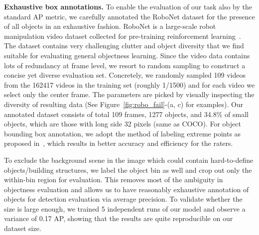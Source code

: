 \documentclass[10pt,twocolumn,letterpaper]{article}
\newcommand{\figureref}[1]{Figure~\ref{#1}}
\renewcommand{\paragraph}[1]{\vspace{1mm}\noindent\textbf{#1}}
\begin{document}
\paragraph{Exhaustive box annotations.} \quad
To enable the evaluation of our task also by the standard AP metric, we carefully annotated the RoboNet dataset for the presence of all objects in an exhaustive fashion. RoboNet is a large-scale robot manipulation video dataset collected for pre-training reinforcement learning~\cite{dasari2019robonet}. The dataset contains very challenging clutter and object diversity that we find suitable for evaluating general objectness learning. Since the video data contains lots of redundancy at frame level, we resort to random sampling to construct a concise yet diverse evaluation set. Concretely, we randomly sampled 109 videos from the 162417 videos in the training set (roughly 1/1500) and for each video we select only the center frame. The parameters are picked by visually inspecting the diversity of resulting data (See \figureref{fig:robo_fail}-(a, c) for examples). Our annotated dataset consists of total 109 frames, 1277 objects, and 34.8\% of small objects, which are those with long side  32 pixels (same as COCO). For object bounding box annotation, we adopt the method of labeling extreme points as proposed in~\cite{kuznetsova2018open}, which results in better accuracy and efficiency for the raters.

To exclude the background scene in the image which could contain hard-to-define objects/building structures, we label the object bin as well and crop out only the within-bin region for evaluation. This removes most of the ambiguity in objectness evaluation and allows us to have reasonably exhaustive annotation of objects for detection evaluation via average precision. To validate whether the size is large enough, we trained 5 independent runs of our model and observe a variance of 0.17 AP, showing that the results are quite reproducible on our dataset size.
\end{document}
